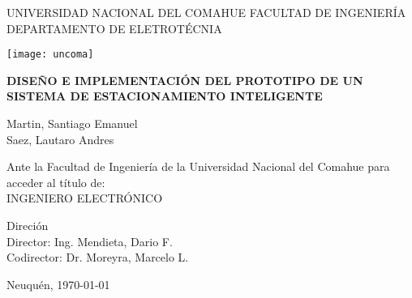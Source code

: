 \begin{titlepage}
    \begin{center}
        UNIVERSIDAD NACIONAL DEL COMAHUE
        FACULTAD DE INGENIERÍA
        DEPARTAMENTO DE ELETROTÉCNIA

        \vspace*{1cm}
        \texttt{[image: uncoma]}
        \vspace*{1cm}

        \begin{large}
            \uppercase{\textbf{Diseño e implementación del prototipo de un sistema de estacionamiento inteligente}}
        \end{large}

        \vspace*{1.5cm}

        Martin, Santiago Emanuel \\
        Saez, Lautaro Andres

        \vspace*{1cm}

        Ante la Facultad de Ingeniería de la Universidad Nacional del Comahue para
        acceder al título de:\\
        INGENIERO ELECTRÓNICO

        \vspace*{0.8cm}

        Direción\\
        Director: Ing. Mendieta, Dario F. \\
        Codirector: Dr. Moreyra, Marcelo L.


        \vspace*{1cm}
        Neuquén, \today


    \end{center}
\end{titlepage}